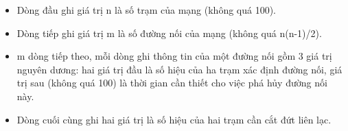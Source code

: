 \begin{itemize}
	\item     Dòng đầu ghi giá trị n là số trạm của mạng (không quá 100).   
	\item     Dòng tiếp ghi giá trị m là số đường nối của mạng (không quá n(n-1)/2).   
	\item     m dòng tiếp theo, mỗi dòng ghi thông tin của một đường nối gồm 3 giá trị nguyên dương: hai giá trị đầu là số hiệu của ha trạm xác định đường nối,   giá trị sau (không quá 100) là thời gian cần thiết cho việc phá hủy đường nối này.   
	\item     Dòng cuối cùng ghi hai giá trị là số hiệu của hai trạm cần cắt đứt liên lạc.   
\end{itemize}

\